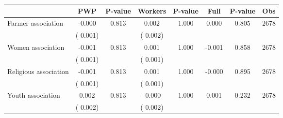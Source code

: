 
\begin{tabular}{l*{7}{c}}\hline&\multicolumn{1}{c}{PWP}&\multicolumn{1}{c}{P-value}&\multicolumn{1}{c}{Workers}&\multicolumn{1}{c}{P-value}&\multicolumn{1}{c}{Full}&\multicolumn{1}{c}{P-value}&\multicolumn{1}{c}{Obs} \\ \hline

 Farmer association       &             -0.000       &        0.813  &              0.002       &        1.000  &              0.000       &              0.805 &  2678 \\ 
                       &       (       0.001)             &                               &       (       0.002)                     &                               &                                               &                                &                      \\ 

 Women association       &             -0.001       &        0.813  &              0.001       &        1.000  &             -0.001       &              0.858 &  2678 \\ 
                       &       (       0.001)             &                               &       (       0.001)                     &                               &                                               &                                &                      \\ 

 Religious association       &             -0.001       &        0.813  &              0.001       &        1.000  &             -0.000       &              0.895 &  2678 \\ 
                       &       (       0.001)             &                               &       (       0.001)                     &                               &                                               &                                &                      \\ 

 Youth association       &              0.002       &        0.813  &             -0.000       &        1.000  &              0.001       &              0.232 &  2678 \\ 
                       &       (       0.002)             &                               &       (       0.002)                     &                               &                                               &                                &                      \\ 


\end{tabular}
